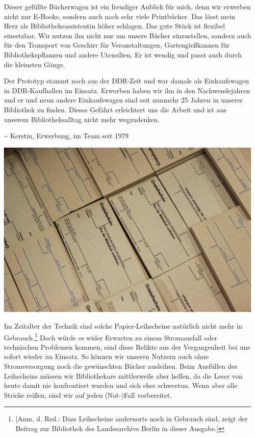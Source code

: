 Dieser gefüllte Bücherwagen ist ein freudiger Anblick für mich, denn wir
erwerben nicht nur E-Books, sondern auch noch sehr viele Printbücher.
Das lässt mein Herz als Bibliotheksassistentin höher schlagen. Das gute
Stück ist flexibel einsetzbar. Wir nutzen ihn nicht nur um unsere Bücher
einzustellen, sondern auch für den Transport von Geschirr für
Veranstaltungen, Gartengießkannen für Bibliothekspflanzen und andere
Utensilien. Er ist wendig und passt auch durch die kleinsten Gänge.

Der Prototyp stammt noch aus der DDR-Zeit und war damals als
Einkaufswagen in DDR-Kaufhallen im Einsatz. Erworben haben wir ihn in
den Nachwendejahren und er und neun andere Einkaufswagen sind seit
nunmehr 25 Jahren in unserer Bibliothek zu finden. Dieses Gefährt
erleichtert uns die Arbeit und ist aus unserem Bibliotheksalltag nicht
mehr wegzudenken.

\textasciitilde{} Kerstin, Erwerbung, im Team seit 1979

\begin{center}
\includegraphics{htw-dresden/img/Leihscheine.jpg}
\end{center}

Im Zeitalter der Technik sind solche Papier-Leihscheine natürlich nicht
mehr in Gebrauch.\footnote{{[}Anm. d. Red.: Dass Leihscheine andernorts
  noch in Gebrauch sind, zeigt der Beitrag zur Bibliothek des
  Landesarchivs Berlin in dieser Ausgabe.{]}} Doch würde es wider
Erwarten zu einem Stromausfall oder technischen Problemen kommen, sind
diese Relikte aus der Vergangenheit bei uns sofort wieder im Einsatz. So
können wir unseren Nutzern auch ohne Stromversorgung noch die
gewünschten Bücher ausleihen. Beim Ausfüllen des Leihscheins müssen wir
Bibliothekare mittlerweile aber helfen, da die Leser von heute damit nie
konfrontiert wurden und sich eher schwertun. Wenn aber alle Stricke
reißen, sind wir auf jeden (Not-)Fall vorbereitet.

